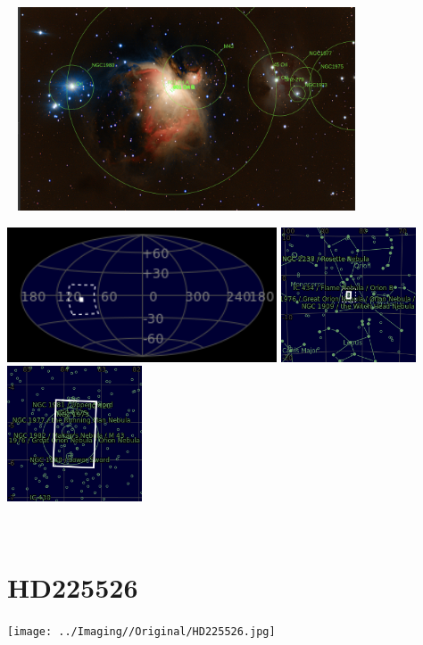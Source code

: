 \begin{center}
 \ \newpage
\includegraphics[width=0.75\textwidth]{../Imaging//Annotated/Great_Orion_Nebula_Annotated.jpg}

\includegraphics[height=4cm]{../Imaging//Annotated/Great_Orion_Nebula_Globe.jpg}
\includegraphics[height=4cm]{../Imaging//Annotated/Great_Orion_Nebula_Close.jpg}
\includegraphics[height=4cm]{../Imaging//Annotated/Great_Orion_Nebula_Closer.jpg}
\end{center}
\ \\\section{HD225526}
\texttt{[image: ../Imaging//Original/HD225526.jpg]}
